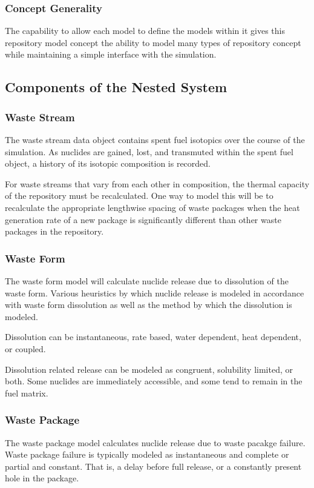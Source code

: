 \subsubsection{Concept Generality}

The capability to allow each model to define the models within it gives this 
repository model concept the ability to model many types of repository concept 
while maintaining a simple interface with the simulation. 

\subsection{Components of the Nested System}

\subsubsection{Waste Stream}

The waste stream data object contains spent fuel isotopics over the 
course of the simulation. As nuclides are gained, lost, and transmuted within 
the spent fuel object, a history of its isotopic composition is recorded.

For waste streams that vary from each other in composition, the thermal capacity 
of the repository must be recalculated. One way to model this will be to 
recalculate the appropriate lengthwise spacing of waste packages when the heat 
generation rate of a new package is significantly different than other waste 
packages in the repository. 

\subsubsection{Waste Form}
The waste form model will calculate nuclide release due to dissolution 
of the waste form. Various heuristics by which nuclide release is modeled in 
accordance with waste form dissolution as well as the method by which 
the dissolution is modeled.

Dissolution can be instantaneous, rate based, water dependent, heat 
dependent, or coupled.

Dissolution related release can be modeled as congruent, solubility 
limited, or both. Some nuclides are immediately accessible, and some 
tend to remain in the fuel matrix. 

\subsubsection{Waste Package}
The waste package model calculates nuclide release due to waste 
pacakge failure. Waste package failure is typically modeled as 
instantaneous and complete or partial and constant. That is, a delay 
before full release, or a constantly present hole in the package.

